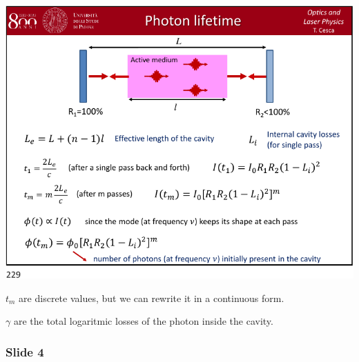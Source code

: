 \documentclass[../main/main.tex]{subfiles}
\begin{document}
\begin{minipage}[]{0.5\linewidth}
\centering
\includegraphics[page=3,width=1\textwidth]{../lessons/pdf_file/12_lecture.pdf}
\end{minipage}
\hspace{0.3cm}\vspace{0.3cm}
\begin{minipage}[c]{0.47\linewidth}

\( t_m \) are discrete values, but we can rewrite it in a continuous form.

\( \gamma   \) are the total logaritmic losses of the photon inside the cavity.

\end{minipage}

\newpage

\subsubsection*{Slide 4}
\end{document}
